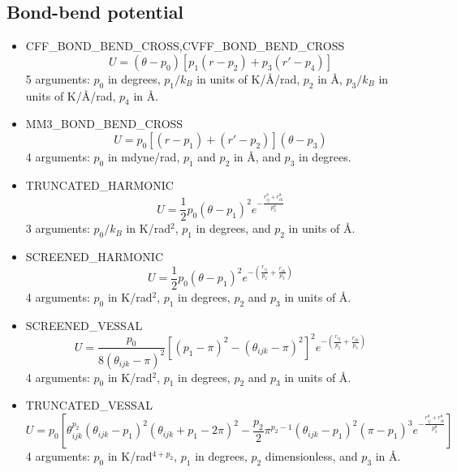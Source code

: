 \subsection{Bond-bend potential}

\begin{itemize}
  \item{CFF\_BOND\_BEND\_CROSS,CVFF\_BOND\_BEND\_CROSS}\\
  \begin{equation}
  U=\left(\theta-p_0\right)\left[p_1\left(r-p_2\right)+p_3\left(r'-p_4\right)\right]
  \end{equation}
  5 arguments: $p_0$ in degrees, $p_1/k_B$ in units of K/\AA/rad, $p_2$ in \AA, $p_3/k_B$ in units of K/\AA/rad, $p_4$ in \AA.

  \item{MM3\_BOND\_BEND\_CROSS}
  \begin{equation}
  U=p_0\left[\left(r-p_1\right)+\left(r'-p_2\right)\right]\left(\theta-p_3\right)
  \end{equation}
  4 arguments: $p_0$ in mdyne/rad, $p_1$ and $p_2$ in \AA, and $p_3$ in degrees.

  \item{TRUNCATED\_HARMONIC}
  \begin{equation}
  U=\frac{1}{2}p_0\left(\theta-p_1\right)^2 e^{-\frac{r_{ij}^8+r_{ik}^8}{p_2^8}}
  \end{equation}
  3 arguments: $p_0/k_B$ in K/rad$^2$, $p_1$ in degrees, and $p_2$ in units of \AA.

  \item{SCREENED\_HARMONIC}
  \begin{equation}
  U=\frac{1}{2}p_0\left(\theta-p_1\right)^2 e^{-\left(\frac{r_{ij}}{p_2}+\frac{r_{ik}}{p_3}\right)}
  \end{equation}
  4 arguments: $p_0$ in K/rad$^2$, $p_1$ in degrees, $p_2$ and $p_3$ in units of \AA.

  \item{SCREENED\_VESSAL}
  \begin{equation}
  U=\frac{p_0}{8\left(\theta_{ijk}-\pi\right)^2}
    \left[\left(p_1-\pi\right)^2-\left(\theta_{ijk}-\pi\right)^2\right]^2
    e^{-\left(\frac{r_{ij}}{p_2}+\frac{r_{ik}}{p_3}\right)}
  \end{equation}
  4 arguments: $p_0$ in K/rad$^2$, $p_1$ in degrees, $p_2$ and $p_3$ in units of \AA.

  \item{TRUNCATED\_VESSAL}
  \begin{equation}
  U=p_0\left[
   \theta_{ijk}^{p_2}\left(\theta_{ijk}-p_1\right)^2
     \left(\theta_{ijk}+p_1-2\pi\right)^2-\frac{p_2}{2}\pi^{p_2-1}
      \left(\theta_{ijk}-p_1\right)^2\left(\pi-p_1\right)^3
    e^{-\frac{r_{ij}^8+r_{ik}^8}{p_3^8}}
    \right]
  \end{equation}
  4 arguments: $p_0$ in K/rad$^{4+p_2}$, $p_1$ in degrees, $p_2$ dimensionless, and $p_3$ in \AA.

\end{itemize}

